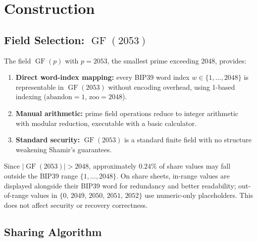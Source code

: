 \documentclass[11pt]{article}
\newcommand{\GF}{\operatorname{GF}}
\begin{document}
\section{Construction}
\label{sec:construction}

\subsection{Field Selection: \texorpdfstring{$\GF(2053)$}{GF(2053)}}

The field $\GF(p)$ with $p = 2053$, the smallest prime exceeding 2048, provides:
\begin{enumerate}[noitemsep]
    \item \textbf{Direct word-index mapping:} every BIP39 word index $w \in \{1, \ldots, 2048\}$ is representable in $\GF(2053)$ without encoding overhead, using 1-based indexing ($\text{abandon} = 1$, $\text{zoo} = 2048$).
    \item \textbf{Manual arithmetic:} prime field operations reduce to integer arithmetic with modular reduction, executable with a basic calculator.
    \item \textbf{Standard security:} $\GF(2053)$ is a standard finite field with no structure weakening Shamir's guarantees.
\end{enumerate}

Since $|\GF(2053)| > 2048$, approximately $0.24\%$ of share values may fall outside the BIP39 range $\{1, \ldots, 2048\}$. On share sheets, in-range values are displayed alongside their BIP39 word for redundancy and better readability; out-of-range values in
$\{0,\, 2049,\, 2050,\, 2051,\, 2052\}$
use numeric-only placeholders. This does not affect security or recovery correctness.

\subsection{Sharing Algorithm}
\label{sec:sharing}
\end{document}
